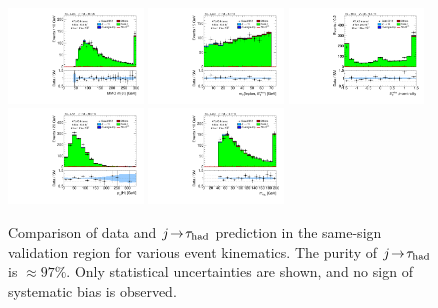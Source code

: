 \begin{figure}[tp]
  \includegraphics[width=0.32\textwidth]{figures/analysis/vbf-SSXCR/mMMC}
  \includegraphics[width=0.32\textwidth]{figures/analysis/vbf-SSXCR/mT}
  \includegraphics[width=0.32\textwidth]{figures/analysis/vbf-SSXCR/met-phi-centrality}
  \includegraphics[width=0.32\textwidth]{figures/analysis/vbf-SSXCR/H-pt-hi}
  \includegraphics[width=0.32\textwidth]{figures/analysis/vbf-SSXCR/mvis}
  \caption{Comparison of data and $j\!\rightarrow\!\tau_\text{had}$ prediction in the same-sign validation region for various event kinematics. The purity of $j\!\rightarrow\!\tau_\text{had}$ is $\approx\! 97\%$. Only statistical uncertainties are shown, and no sign of systematic bias is observed.}
  \label{fig:backgrounds-SSXCR-taus}
\end{figure}

